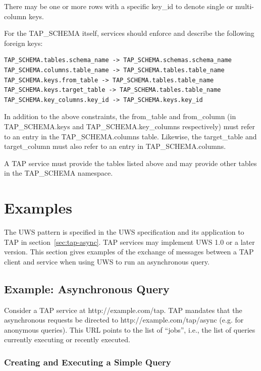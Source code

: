 \documentclass[11pt,letter]{ivoa}
\newcommand{\tapschema}{TAP\_SCHE\-MA}
\newcommand{\tapschema}{\mbox{%
  \relsize{-0.5}TAP\discretionary{-}{}{\kern-2pt\_}SCHEMA}}
\begin{document}
There may be one or more rows with a specific key\_id to denote single or multi-column keys.

For the \tapschema{} itself, services should enforce and describe the following foreign keys:

\begin{verbatim}
TAP_SCHEMA.tables.schema_name -> TAP_SCHEMA.schemas.schema_name
TAP_SCHEMA.columns.table_name -> TAP_SCHEMA.tables.table_name
TAP_SCHEMA.keys.from_table -> TAP_SCHEMA.tables.table_name
TAP_SCHEMA.keys.target_table -> TAP_SCHEMA.tables.table_name
TAP_SCHEMA.key_columns.key_id -> TAP_SCHEMA.keys.key_id
\end{verbatim}

In addition to the above constraints, the from\_table and from\_column (in \tapschema.keys and 
\tapschema.key\_columns respectively) must refer to an entry in the \tapschema.columns table. Likewise, 
the target\_table and target\_column must also refer to an entry in \tapschema.columns.

A TAP service must provide the tables listed above and may provide other tables 
in the \tapschema{} namespace.


\section{Examples}
\label{sec:examples}

The UWS pattern is specified in the UWS specification \citep{2016ivoa.spec.1024H} and its application to TAP in 
section~\ref{sec:tap-async}. TAP services may implement UWS 1.0
or a later version. 
This section gives examples of the exchange of messages between a 
TAP client and service when using UWS to run an asynchronous query.

\subsection{Example: Asynchronous Query}
Consider a TAP service at http://example.com/tap. TAP mandates that the 
asynchronous requests be directed to http://example.com/tap/async (e.g. for 
anonymous queries). This URL points to the list of ``jobs'', i.e., the list of 
queries currently executing or recently executed.

\subsubsection{Creating and Executing a Simple Query}
\end{document}
